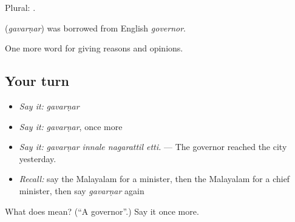 Plural: .

\begin{cousinweb}
\textbf{} (\emph{gavarṇar}) was borrowed from English \emph{governor}.
\end{cousinweb}

\begin{grammarlens}[title={What you've built}]
One more word for giving reasons and opinions.
\end{grammarlens}

\subsection*{Your turn}
\begin{itemize}
\raggedright
  \item \emph{Say it:} \emph{gavarṇar}
  \item \emph{Say it:} \emph{gavarṇar}, once more
  \item \emph{Say it:} \emph{gavarṇar innale nagarattil etti.} — The governor reached the city yesterday.
  \item \emph{Recall:} say the Malayalam for a minister, then the Malayalam for a chief minister, then say \emph{gavarṇar} again
\end{itemize}

\begin{tcolorbox}[breakable,colback=teal!4,colframe=teal!35!black,title={Before you move on}]
What does  mean? (\textquotedblleft{}A governor\textquotedblright{}.) Say it once more.
\end{tcolorbox}
